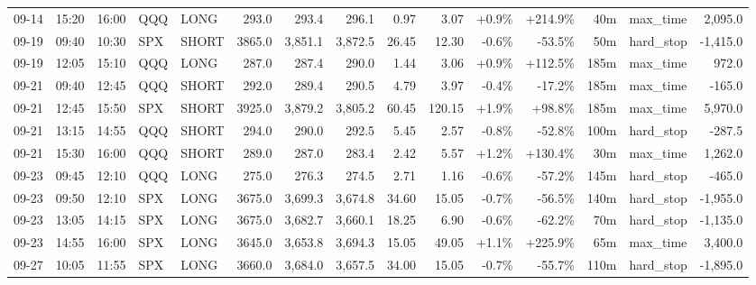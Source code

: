 \documentclass[11pt,a4paper,twoside]{article}
\begin{document}
\begin{landscape}
\begin{center}
\begin{longtable}{>{\color{txtmain}}l l l l l r r r r r r r r >{\color{txtmain}}l r}
09-14 & 15:20 & 16:00 & QQQ & LONG & 293.0 & 293.4 & 296.1 & 0.97 & 3.07 & \textcolor{wingreen}{+0.9\%} & \textcolor{wingreen}{+214.9\%} & 40m & max\_time & \textcolor{wingreen}{2,095.0} \\
09-19 & 09:40 & 10:30 & SPX & SHORT & 3865.0 & 3,851.1 & 3,872.5 & 26.45 & 12.30 & \textcolor{lossred}{-0.6\%} & \textcolor{lossred}{-53.5\%} & 50m & hard\_stop & \textcolor{lossred}{-1,415.0} \\
09-19 & 12:05 & 15:10 & QQQ & LONG & 287.0 & 287.4 & 290.0 & 1.44 & 3.06 & \textcolor{wingreen}{+0.9\%} & \textcolor{wingreen}{+112.5\%} & 185m & max\_time & \textcolor{wingreen}{972.0} \\
09-21 & 09:40 & 12:45 & QQQ & SHORT & 292.0 & 289.4 & 290.5 & 4.79 & 3.97 & \textcolor{lossred}{-0.4\%} & \textcolor{lossred}{-17.2\%} & 185m & max\_time & \textcolor{lossred}{-165.0} \\
09-21 & 12:45 & 15:50 & SPX & SHORT & 3925.0 & 3,879.2 & 3,805.2 & 60.45 & 120.15 & \textcolor{wingreen}{+1.9\%} & \textcolor{wingreen}{+98.8\%} & 185m & max\_time & \textcolor{wingreen}{5,970.0} \\
09-21 & 13:15 & 14:55 & QQQ & SHORT & 294.0 & 290.0 & 292.5 & 5.45 & 2.57 & \textcolor{lossred}{-0.8\%} & \textcolor{lossred}{-52.8\%} & 100m & hard\_stop & \textcolor{lossred}{-287.5} \\
09-21 & 15:30 & 16:00 & QQQ & SHORT & 289.0 & 287.0 & 283.4 & 2.42 & 5.57 & \textcolor{wingreen}{+1.2\%} & \textcolor{wingreen}{+130.4\%} & 30m & max\_time & \textcolor{wingreen}{1,262.0} \\
09-23 & 09:45 & 12:10 & QQQ & LONG & 275.0 & 276.3 & 274.5 & 2.71 & 1.16 & \textcolor{lossred}{-0.6\%} & \textcolor{lossred}{-57.2\%} & 145m & hard\_stop & \textcolor{lossred}{-465.0} \\
09-23 & 09:50 & 12:10 & SPX & LONG & 3675.0 & 3,699.3 & 3,674.8 & 34.60 & 15.05 & \textcolor{lossred}{-0.7\%} & \textcolor{lossred}{-56.5\%} & 140m & hard\_stop & \textcolor{lossred}{-1,955.0} \\
09-23 & 13:05 & 14:15 & SPX & LONG & 3675.0 & 3,682.7 & 3,660.1 & 18.25 & 6.90 & \textcolor{lossred}{-0.6\%} & \textcolor{lossred}{-62.2\%} & 70m & hard\_stop & \textcolor{lossred}{-1,135.0} \\
09-23 & 14:55 & 16:00 & SPX & LONG & 3645.0 & 3,653.8 & 3,694.3 & 15.05 & 49.05 & \textcolor{wingreen}{+1.1\%} & \textcolor{wingreen}{+225.9\%} & 65m & max\_time & \textcolor{wingreen}{3,400.0} \\
09-27 & 10:05 & 11:55 & SPX & LONG & 3660.0 & 3,684.0 & 3,657.5 & 34.00 & 15.05 & \textcolor{lossred}{-0.7\%} & \textcolor{lossred}{-55.7\%} & 110m & hard\_stop & \textcolor{lossred}{-1,895.0} \\

\end{longtable}
\end{center}
\end{landscape}
\end{document}
